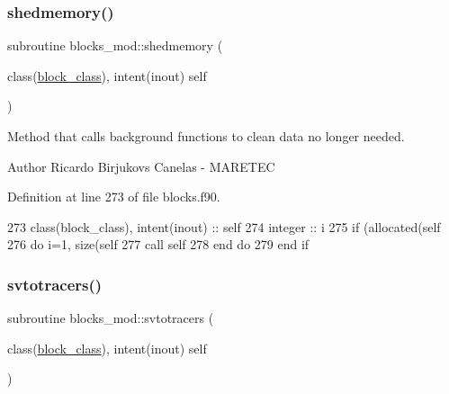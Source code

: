 \mbox{\label{namespaceblocks__mod_a04a9fab577b0d1fb6cabefcde2b2180d}} 
\subsubsection{\texorpdfstring{shedmemory()}{shedmemory()}}
{\footnotesize\ttfamily subroutine blocks\+\_\+mod\+::shedmemory (\begin{DoxyParamCaption}\item[{class(\mbox{\hyperlink{structblocks__mod_1_1block__class}{block\+\_\+class}}), intent(inout)}]{self }\end{DoxyParamCaption})\hspace{0.3cm}{\ttfamily [private]}}



Method that calls background functions to clean data no longer needed. 

\begin{DoxyAuthor}{Author}
Ricardo Birjukovs Canelas -\/ M\+A\+R\+E\+T\+EC 
\end{DoxyAuthor}


Definition at line 273 of file blocks.\+f90.


\begin{DoxyCode}
273     \textcolor{keywordtype}{class}(block\_class), \textcolor{keywordtype}{intent(inout)} :: self
274     \textcolor{keywordtype}{integer} :: i
275     \textcolor{keywordflow}{if} (\textcolor{keyword}{allocated}(self%
276         \textcolor{keywordflow}{do} i=1, \textcolor{keyword}{size}(self%
277             \textcolor{keyword}{call }self%
278 \textcolor{keywordflow}{        end do}
279 \textcolor{keywordflow}{    end if}
\end{DoxyCode}
\mbox{\label{namespaceblocks__mod_a306a753acc9b8bb9107ebda481162180}} 
\subsubsection{\texorpdfstring{svtotracers()}{svtotracers()}}
{\footnotesize\ttfamily subroutine blocks\+\_\+mod\+::svtotracers (\begin{DoxyParamCaption}\item[{class(\mbox{\hyperlink{structblocks__mod_1_1block__class}{block\+\_\+class}}), intent(inout)}]{self }\end{DoxyParamCaption})\hspace{0.3cm}{\ttfamily [private]}}




